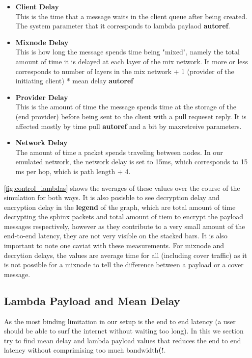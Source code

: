 \documentclass[a4paper,11pt,oneside]{report}
\begin{document}
\begin{itemize}
    \item \textbf{Client Delay} \\
    This is the time that a message waits in the client queue after being created. The system parameter that it corresponds  to lambda paylaod \textbf{autoref{}}. 
    \item \textbf{Mixnode Delay} \\
    This is how long the message spends time being "mixed", namely the total amount of time it is delayed at each layer of the mix network. It more or less corresponds to number of layers in the mix network + 1 (provider of the initiating client) * mean delay \textbf{autoref}
    \item \textbf{Provider Delay} \\
    This is the amount of time the message spends time at the storage of the (end provider) before being sent to the client with a pull requeset reply. It is affected mostly by time pull \textbf{autoref} and a bit by maxretreive parameters.
    \item \textbf{Network Delay} \\
    The amount of time a packet spends traveling between nodes. In our emulated network, the network delay is set to 15ms, which corresponds to 15 ms per hop, which is path length + 4. 
\end{itemize}

\autoref{fig:control_lambdas} shows the averages of these values over the course of the simulation for both ways. It is also posisble to see decryption delay and encryption delay in the \textbf{legend} of the graph, which are total amount of time decrypting the sphinx packets and total amount of tiem to encrypt the payload messages respectively, however as they contribute to a very small amount of the end-to-end latency, they are not very visible on the stacked bars. 
It is also important to note one caviat with these measurements. For mixnode and decrytion delays, the values are average time for all (including cover traffic) as it is not possible for a mixnode to tell the difference between a payload or a cover message.

\subsection{Lambda Payload and Mean Delay}
As the most binding limitation in our setup is the end to end latency (a user should be able to surf the internet without waiting too long). In this we section try to find mean delay and lambda payload values that reduces the end to end latency without comprimising too much bandwidth\textbf{(!}.
\end{document}
